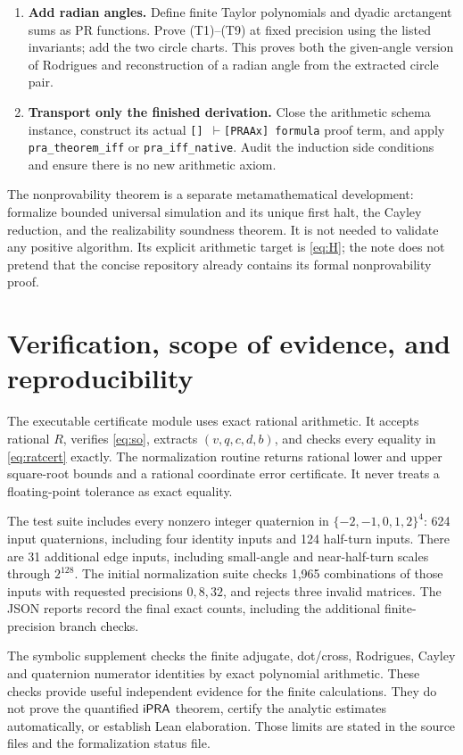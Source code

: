 \begin{enumerate}
proofs use the displayed overlapping thresholds.
\item \textbf{Add radian angles.} Define finite Taylor polynomials and
dyadic arctangent sums as PR functions. Prove (T1)--(T9) at fixed
precision using the listed invariants; add the two circle charts. This
proves both the given-angle version of Rodrigues and reconstruction
of a radian angle from the extracted circle pair.
\item \textbf{Transport only the finished derivation.} Close the
arithmetic schema instance, construct its actual
\texttt{[] $\vdash$[PRAAx] formula} proof term, and apply
\texttt{pra\_theorem\_iff} or \texttt{pra\_iff\_native}. Audit the
induction side conditions and ensure there is no new arithmetic axiom.
\end{enumerate}

The nonprovability theorem is a separate metamathematical development:
formalize bounded universal simulation and its unique first halt,
the Cayley reduction, and the realizability soundness theorem. It is
not needed to validate any positive algorithm. Its explicit arithmetic
target is \eqref{eq:H}; the note does not pretend that the concise
repository already contains its formal nonprovability proof.

\section{Verification, scope of evidence, and reproducibility}
\label{sec:verification}

The executable certificate module uses exact rational arithmetic.
It accepts rational $R$, verifies \eqref{eq:so}, extracts
$(v,q,c,d,b)$, and checks every equality in \eqref{eq:ratcert} exactly.
The normalization routine returns rational lower and upper square-root
bounds and a rational coordinate error certificate. It never treats
a floating-point tolerance as exact equality.

The test suite includes every nonzero integer quaternion in
$\{-2,-1,0,1,2\}^4$: 624 input quaternions, including four identity
inputs and 124 half-turn inputs. There are 31 additional edge inputs,
including small-angle and near-half-turn scales through $2^{128}$.
The initial normalization suite checks 1,965 combinations of those
inputs with requested precisions $0,8,32$, and rejects three invalid
matrices. The JSON reports record the final exact counts, including
the additional finite-precision branch checks.

The symbolic supplement checks the finite adjugate, dot/cross,
Rodrigues, Cayley and quaternion numerator identities by exact polynomial
arithmetic. These checks provide useful independent evidence for the
finite calculations. They do not prove the quantified $\mathsf{iPRA}$ theorem,
certify the analytic estimates automatically, or establish Lean
elaboration. Those limits are stated in the source files and the
formalization status file.

